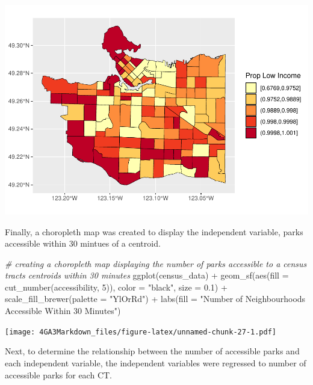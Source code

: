 \documentclass[
]{article}
\newenvironment{Shaded}{\begin{snugshade}}{\end{snugshade}}
\newcommand{\AttributeTok}[1]{\textcolor[rgb]{0.77,0.63,0.00}{#1}}
\newcommand{\CommentTok}[1]{\textcolor[rgb]{0.56,0.35,0.01}{\textit{#1}}}
\newcommand{\DecValTok}[1]{\textcolor[rgb]{0.00,0.00,0.81}{#1}}
\newcommand{\FloatTok}[1]{\textcolor[rgb]{0.00,0.00,0.81}{#1}}
\newcommand{\FunctionTok}[1]{\textcolor[rgb]{0.00,0.00,0.00}{#1}}
\newcommand{\NormalTok}[1]{#1}
\newcommand{\SpecialCharTok}[1]{\textcolor[rgb]{0.00,0.00,0.00}{#1}}
\newcommand{\StringTok}[1]{\textcolor[rgb]{0.31,0.60,0.02}{#1}}
\begin{document}
\includegraphics{4GA3Markdown_files/figure-latex/unnamed-chunk-26-1.pdf}

Finally, a choropleth map was created to display the independent
variable, parks accessible within 30 mintues of a centroid.

\begin{Shaded}
\begin{Highlighting}[]
\CommentTok{\# creating a choropleth map displaying the number of parks accessible to a census tract\textquotesingle{}s centroids within 30 minutes}
\FunctionTok{ggplot}\NormalTok{(census\_data) }\SpecialCharTok{+}
\FunctionTok{geom\_sf}\NormalTok{(}\FunctionTok{aes}\NormalTok{(}\AttributeTok{fill =} \FunctionTok{cut\_number}\NormalTok{(accessibility, }\DecValTok{5}\NormalTok{)),}
        \AttributeTok{color =} \StringTok{"black"}\NormalTok{,}
        \AttributeTok{size =} \FloatTok{0.1}\NormalTok{) }\SpecialCharTok{+}
\FunctionTok{scale\_fill\_brewer}\NormalTok{(}\AttributeTok{palette =} \StringTok{"YlOrRd"}\NormalTok{) }\SpecialCharTok{+}
\FunctionTok{labs}\NormalTok{(}\AttributeTok{fill =} \StringTok{"Number of Neighbourhoods Accessible Within 30 Minutes"}\NormalTok{)}
\end{Highlighting}
\end{Shaded}

\texttt{[image: 4GA3Markdown\_files/figure-latex/unnamed-chunk-27-1.pdf]}

Next, to determine the relationship between the number of accessible
parks and each independent variable, the independent variables were
regressed to number of accessible parks for each CT.
\end{document}
